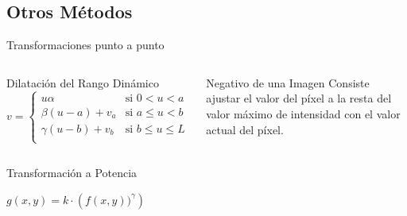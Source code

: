 \documentclass{beamer}
\begin{document}
\subsection{Otros Métodos}

\begin{frame}{Transformaciones punto a punto}
\begin{columns}
\column[t]{6.5cm}
\begin{block}{Dilatación del Rango Dinámico}
\begin{math}
v= \left\{
	\begin{array}{cl}
		u\alpha & \mbox{si } 0<u<a\\
		\beta(u-a)+v_a &\mbox{si } a\leq u<b\\
	\gamma(u-b)+v_b &\mbox{si } b\leq u\leq L\\
	\end{array}\right.
\end{math}
\end{block}

\column[t]{5cm}
\begin{block}{Negativo de una Imagen}
\justifying
Consiste ajustar el valor del píxel a la resta del valor máximo de intensidad con el valor actual del píxel.
\end{block}
\end{columns}

\begin{block}{\begin{center}Transformación a Potencia\end{center}}
\begin{center}
\begin{math}
g(x,y) = k \cdot \left( f(x,y) )^{\gamma} \right)
\end{math}
\end{center}
\end{block}

\end{frame}
\end{document}
